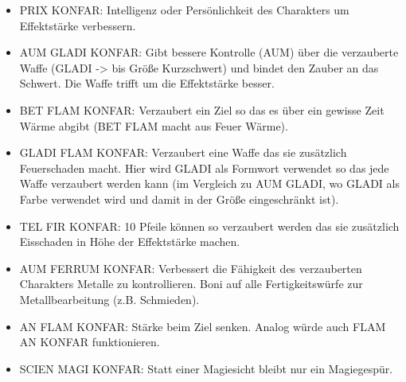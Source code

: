 \documentclass{article}
\begin{document}
\begin{itemize}
\item PRIX KONFAR: Intelligenz oder Persönlichkeit des Charakters um Effektstärke verbessern.
\item AUM GLADI KONFAR: Gibt bessere Kontrolle (AUM) über die verzauberte Waffe (GLADI -> bis Größe Kurzschwert) und bindet den Zauber an das Schwert. Die Waffe trifft um die Effektstärke besser.
\item BET FLAM KONFAR: Verzaubert ein Ziel so das es über ein gewisse Zeit Wärme abgibt (BET FLAM macht aus Feuer Wärme).
\item GLADI FLAM KONFAR: Verzaubert eine Waffe das sie zusätzlich Feuerschaden macht. Hier wird GLADI als Formwort verwendet so das jede Waffe verzaubert werden kann (im Vergleich zu AUM GLADI, wo GLADI als Farbe verwendet wird und damit in der Größe eingeschränkt ist).
\item TEL FIR KONFAR: 10 Pfeile können so verzaubert werden das sie zusätzlich Eisschaden in Höhe der Effektstärke machen.
\item AUM FERRUM KONFAR: Verbessert die Fähigkeit des verzauberten Charakters Metalle zu kontrollieren. Boni auf alle Fertigkeitswürfe zur Metallbearbeitung (z.B. Schmieden).
\item AN FLAM KONFAR: Stärke beim Ziel senken. Analog würde auch FLAM AN KONFAR funktionieren.
\item SCIEN MAGI KONFAR: Statt einer Magiesicht bleibt nur ein Magiegespür.
\end{itemize}
\end{document}
